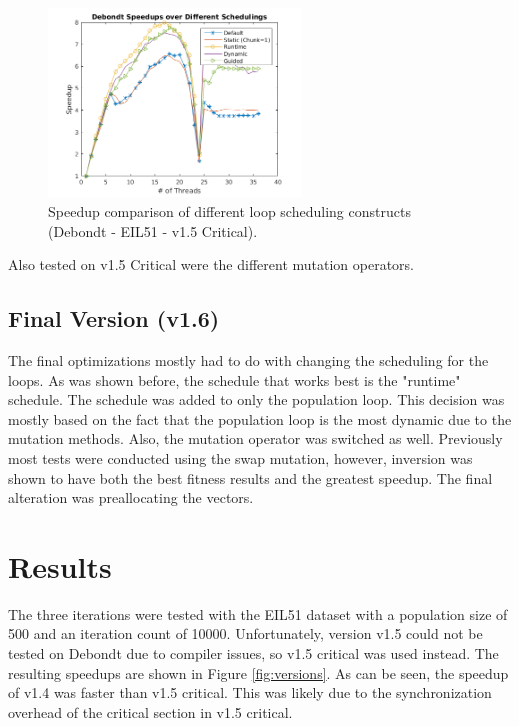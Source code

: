 \documentclass[10pt,letterpaper]{article}
\begin{document}
\begin{figure}
\centering
\includegraphics[width=0.6\textwidth]{../img/debondt_schedulers.png}
\caption{Speedup comparison of different loop scheduling constructs (Debondt - EIL51 - v1.5 Critical).}
\label{fig:schedules}
\end{figure}

Also tested on v1.5 Critical were the different mutation operators.

\newpage
\subsection{Final Version (v1.6)}
The final optimizations mostly had to do with changing the scheduling for the loops. As was shown before, the schedule that works best is the "runtime" schedule. The schedule was added to only the population loop. This decision was mostly based on the fact that the population loop is the most dynamic due to the mutation methods. Also, the mutation operator was switched as well. Previously most tests were conducted using the swap mutation, however, inversion was shown to have both the best fitness results and the greatest speedup. The final alteration was preallocating the vectors.

\section{Results} \label{sec:results}
The three iterations were tested with the EIL51 dataset with a population size of 500 and an iteration count of 10000. Unfortunately, version v1.5 could not be tested on Debondt due to compiler issues, so v1.5 critical was used instead. The resulting speedups are shown in Figure \ref{fig:versions}. As can be seen, the speedup of v1.4 was faster than v1.5 critical. This was likely due to the synchronization overhead of the critical section in v1.5 critical.
\end{document}
